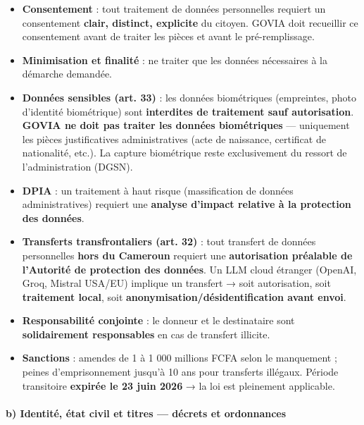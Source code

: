 \documentclass[
]{article}
\providecommand{\tightlist}{%
  \setlength{\itemsep}{0pt}\setlength{\parskip}{0pt}}
\begin{document}
\begin{itemize}
\tightlist
\item
  \textbf{Consentement} : tout traitement de données personnelles
  requiert un consentement \textbf{clair, distinct, explicite} du
  citoyen. GOVIA doit recueillir ce consentement avant de traiter les
  pièces et avant le pré-remplissage.
\item
  \textbf{Minimisation et finalité} : ne traiter que les données
  nécessaires à la démarche demandée.
\item
  \textbf{Données sensibles (art. 33)} : les données biométriques
  (empreintes, photo d'identité biométrique) sont \textbf{interdites de
  traitement sauf autorisation}. \textbf{GOVIA ne doit pas traiter les
  données biométriques} --- uniquement les pièces justificatives
  administratives (acte de naissance, certificat de nationalité, etc.).
  La capture biométrique reste exclusivement du ressort de
  l'administration (DGSN).
\item
  \textbf{DPIA} : un traitement à haut risque (massification de données
  administratives) requiert une \textbf{analyse d'impact relative à la
  protection des données}.
\item
  \textbf{Transferts transfrontaliers (art. 32)} : tout transfert de
  données personnelles \textbf{hors du Cameroun} requiert une
  \textbf{autorisation préalable de l'Autorité de protection des
  données}. Un LLM cloud étranger (OpenAI, Groq, Mistral USA/EU)
  implique un transfert → soit autorisation, soit \textbf{traitement
  local}, soit \textbf{anonymisation/désidentification avant envoi}.
\item
  \textbf{Responsabilité conjointe} : le donneur et le destinataire sont
  \textbf{solidairement responsables} en cas de transfert illicite.
\item
  \textbf{Sanctions} : amendes de 1 à 1 000 millions FCFA selon le
  manquement ; peines d'emprisonnement jusqu'à 10 ans pour transferts
  illégaux. Période transitoire \textbf{expirée le 23 juin 2026} → la
  loi est pleinement applicable.
\end{itemize}

\paragraph{b) Identité, état civil et titres --- décrets et
ordonnances}\label{b-identituxe9-uxe9tat-civil-et-titres-duxe9crets-et-ordonnances}
\end{document}
